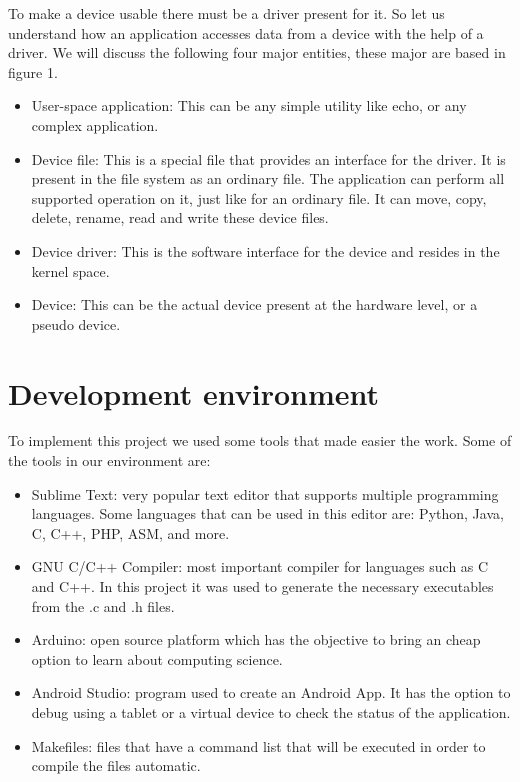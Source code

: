 \documentclass[12pt,twoside]{article}
\begin{document}
To make a device usable there must be a driver present for it. So let us understand how an application accesses data from a device with the help of a driver. We will discuss the following four major entities, these major are based in figure 1.
\begin{itemize}
\item User-space application: This can be any simple utility like echo, or any complex application.
\item Device file: This is a special file that provides an interface for the driver. It is present in the file system as an ordinary file. The application can perform all supported operation on it, just like for an ordinary file. It can move, copy, delete, rename, read and write these device files.
\item Device driver: This is the software interface for the device and resides in the kernel space.
\item Device: This can be the actual device present at the hardware level, or a pseudo device.
\end{itemize}

\newpage

\section{Development environment}

To implement this project we used some tools that made easier the work. Some of the tools in our environment are:

\begin{itemize}
\item Sublime Text: very popular text editor that supports multiple programming languages. Some languages that can be used in this editor are: Python, Java, C, C++, PHP, ASM, and more.
\item GNU C/C++ Compiler: most important compiler for languages such as C and C++. In this project it was used to generate the necessary executables from the .c and .h files.
\item Arduino: open source platform which has the objective to bring an cheap option to learn about computing science.
\item Android Studio: program used to create an Android App. It has the option to debug using a tablet or a virtual device to check the status of the application. 
\item Makefiles: files that have a command list that will be executed in order to compile the files automatic.
\end{itemize}
\end{document}
